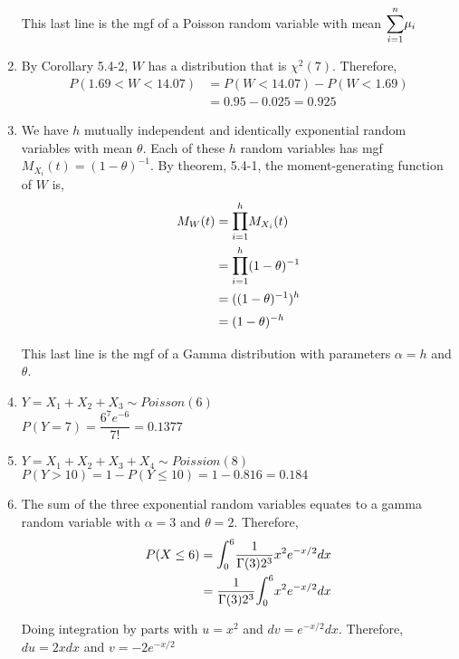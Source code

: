\documentclass{article}
\newcommand\lint{\mathlarger{\int}}
\newcommand\lsum{\mathlarger{\sum}}
\newcommand\lprod{\mathlarger{\prod}}
\newcommand\myskip[1]{\addtocounter{enumi}{#1}}
\begin{document}
\begin{enumerate}
      This last line is the mgf of a Poisson random variable with mean $\lsum_{i=1}^n {\mu_i}$
     
     \item
      By Corollary 5.4-2, $W$ has a distribution that is $\chi^2(7)$. Therefore,
      \begin{align*}
       P(1.69 < W < 14.07) &= P(W < 14.07) - P(W < 1.69) \\
	&= 0.95 - 0.025 = 0.925
      \end{align*}
     \myskip{2}
     
     \item
      We have $h$ mutually independent and identically exponential random variables with mean $\theta$.
      Each of these $h$ random variables has mgf $M_{X_i}(t) = (1-\theta)^{-1}$. By theorem, 5.4-1,
      the moment-generating function of $W$ is,
      \begin{align*}
       M_W(t) &= \lprod_{i=1}^h M_{X_i}(t) \\
	&= \lprod_{i=1}^h {(1 - \theta)^{-1}} \\
	&= ((1 - \theta)^{-1})^h \\
	&= (1 - \theta)^{-h}
      \end{align*}
      
      This last line is the mgf of a Gamma distribution with parameters $\alpha = h$ and $\theta$.
     \myskip{5}
     
     \item
      $Y = X_1 + X_2 + X_3 \sim Poisson(6)$ \\
      $P(Y = 7) = \dfrac{6^7 e^{-6}}{7!} = 0.1377$
     \myskip{1}
     
     \item
      $Y = X_1 + X_2 + X_3 + X_4 \sim Poission(8)$ \\
      $P(Y > 10) = 1 - P(Y \le 10) = 1 - 0.816 = 0.184$
     \myskip{2}
     
     \item
      The sum of the three exponential random variables equates to a gamma random variable
      with $\alpha = 3$ and $\theta = 2$. Therefore,
      \begin{align*}
       P(X \le 6) &= \lint_0^6 {\dfrac{1}{\Gamma(3)2^3} x^2 e^{-x/2} dx} \\
	&= \dfrac{1}{\Gamma(3)2^3} \lint_0^6 {x^2 e^{-x/2} dx} 
      \end{align*}
      
      Doing integration by parts with $u = x^2$ and $dv = e^{-x/2} dx$. Therefore, $du = 2x dx$
      and $v = -2e^{-x/2}$
      

\end{enumerate}
\end{document}
